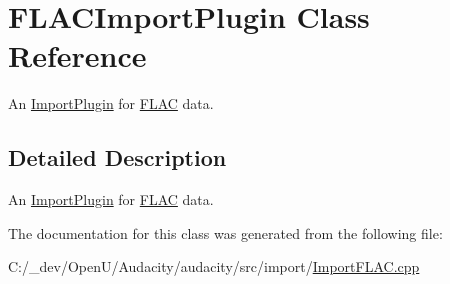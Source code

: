\hypertarget{class_f_l_a_c_import_plugin}{}\section{F\+L\+A\+C\+Import\+Plugin Class Reference}
\label{class_f_l_a_c_import_plugin}


An \hyperlink{class_import_plugin}{Import\+Plugin} for \hyperlink{namespace_f_l_a_c}{F\+L\+AC} data.  




\subsection{Detailed Description}
An \hyperlink{class_import_plugin}{Import\+Plugin} for \hyperlink{namespace_f_l_a_c}{F\+L\+AC} data. 

The documentation for this class was generated from the following file\+:\begin{DoxyCompactItemize}
\item 
C\+:/\+\_\+dev/\+Open\+U/\+Audacity/audacity/src/import/\hyperlink{_import_f_l_a_c_8cpp}{Import\+F\+L\+A\+C.\+cpp}\end{DoxyCompactItemize}
